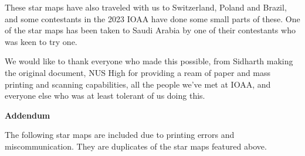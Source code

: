 \documentclass{article}
\begin{document}
These star maps have also traveled with us to Switzerland, Poland and Brazil, and some contestants in the 2023 IOAA have done some small parts of these. One of the star maps has been taken to Saudi Arabia by one of their contestants who was keen to try one.

We would like to thank everyone who made this possible, from Sidharth making the original document, NUS High for providing a ream of paper and mass printing and scanning capabilities, all the people we've met at IOAA, and everyone else who was at least tolerant of us doing this.

\newpage
\vspace*{\fill}
\begingroup
\centering
\textbf{Addendum}

The following star maps are included due to printing errors and miscommunication. They are duplicates of the star maps featured above.

\endgroup
\vspace*{\fill}




\end{document}
